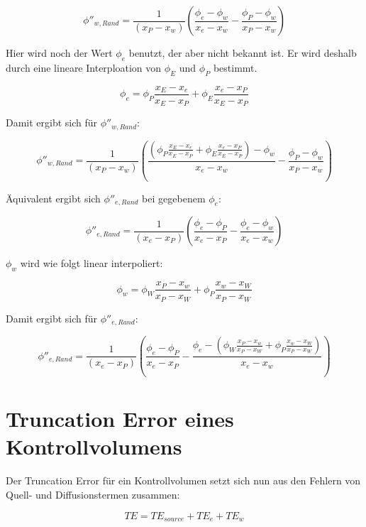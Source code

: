 \documentclass[10pt, ngerman,colorback,accentcolor=tud2d]{tudreport}
\begin{document}
\begin{equation*}
  \phi''_{w, Rand} = \frac{1}{(x_P-x_w)}\left({
\frac{\phi_{e}-\phi_w}{x_{e}-x_w}-\frac{\phi_P-\phi_w}{x_P-x_w}}\right)
\end{equation*}

Hier wird noch der Wert $\phi_e$ benutzt, der aber nicht bekannt ist. Er wird deshalb
durch eine lineare Interploation von $\phi_E$ und $\phi_P$ bestimmt.

\begin{equation}
  \phi_e = \phi_P \frac{x_E-x_e}{x_E-x_P} + \phi_E \frac{x_e-x_P}{x_E-x_P}
\end{equation}

Damit ergibt sich für $\phi''_{w,Rand}$:

\begin{equation}
  \phi''_{w,Rand}  = \frac{1}{(x_P-x_w)}\left({
\frac{
  \left({\phi_P \frac{x_E-x_e}{x_E-x_P} + \phi_E \frac{x_e-x_P}{x_E-x_P}
}\right)
-\phi_w}{x_{e}-x_w}-\frac{\phi_P-\phi_w}{x_P-x_w}}\right)
\end{equation}

Äquivalent ergibt sich $\phi''_{e, Rand}$ bei gegebenem $\phi_e$:

\begin{equation*}
  \phi''_{e, Rand} = \frac{1}{(x_e-x_P)}\left({
\frac{\phi_{e}-\phi_P}{x_{e}-x_P}-\frac{\phi_e-\phi_w}{x_e-x_w}}\right)
\end{equation*}

$\phi_w$ wird wie folgt linear interpoliert:

\begin{equation*}
  \phi_w = \phi_W \frac{x_P-x_w}{x_P-x_W} + \phi_P \frac{x_w-x_W}{x_P-x_W}
\end{equation*}

Damit ergibt sich für $\phi''_{e,Rand}$:

\begin{equation}
  \phi''_{e,Rand} = \frac{1}{(x_e-x_P)}\left({
\frac{\phi_{e}-\phi_P}{x_{e}-x_P}-\frac{\phi_e-
  \left({
   \phi_W \frac{x_P-x_w}{x_P-x_W} + \phi_P \frac{x_w-x_W}{x_P-x_W}
  }\right)
}{x_e-x_w}}\right)
\end{equation}

\section{Truncation Error eines Kontrollvolumens}
\label{sec:Truncation Error eines Kontrollvolumens}

Der Truncation Error für ein Kontrollvolumen setzt sich nun aus den Fehlern von Quell-
und Diffusionstermen zusammen:

\begin{equation*}
  TE = TE_{source} + TE_e + TE_w
\end{equation*}
\end{document}
